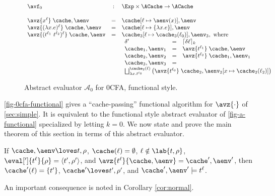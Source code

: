 \begin{figure}[h]
\begin{displaymath}
\begin{array}{lcl}
\avf_0 & : & \Exp \times \ACache\rightarrow \ACache\\ 
\\
\avz{x^\ell}\;\cache,\aenv & = & 
\cache[\ell \mapsto \aenv(x)], \aenv\\
\avz{(\lambda x.e)^\ell}\;\cache,\aenv & = & 
\cache[\ell \mapsto \{\lambda x.e\}], \aenv\\
\avz{(t^{\ell_1}\ t^{\ell_2})^\ell}\;\cache,\aenv & = &
\cache_3[\ell\mapsto \cache_3(\ell_0)],\aenv_3,\mbox{ where}\\
\ &\ &\begin{array}{lcl}
  \delta' & = & \lceil\delta\ell\rceil_k\\
  \cache_1,\aenv_1 & = & \avz{t^{\ell_1}}\;\cache,\aenv\\
  \cache_2,\aenv_2 & = & \avz{t^{\ell_2}}\;\cache_1,\aenv_1\\
  \cache_3,\aenv_3 & = & \\
\multicolumn{3}{c}{
\bigsqcup\nolimits_{\lambda x.t^{\ell_0}}^{\cache_2(\ell)}
\left(\avz{t^{\ell_0}}\;\cache_2,\aenv_2[x\mapsto \cache_2(\ell_2)]\right)}
\end{array}
\end{array}
\end{displaymath}
\caption{Abstract evaluator $\mathcal{A}_0$ for 0CFA, functional style.}
\label{fig-0cfa-functional}
\end{figure}

\autoref{fig-0cfa-functional} gives a ``cache-passing'' functional
algorithm for $\avz{\cdot}$ of \autoref{sec:simple}.  It is equivalent
to the functional style abstract evaluator of
\autoref{fig-a-functional} specialized by letting $k = 0$.
We now state and prove the main theorem of this section in terms of
this abstract evaluator.

\begin{theorem}\label{thm:main}
  If $\cache,\aenv\loves t,\rho$, $\cache(\ell)=\emptyset$,
  $\ell\notin\lab{t,\rho}$, $\eval[']{t^\ell}{\rho} = \langle
  t',\rho'\rangle$, and $\avz{t^\ell}{\cache,\aenv} = \cache',\aenv'$,
  then $\cache'(\ell) = \{ t' \}$, $\cache'\loves t',\rho'$, and
  $\cache',\aenv'\models t^\ell$.
\end{theorem}
An important consequence is noted in Corollary \ref{cor:normal}.

